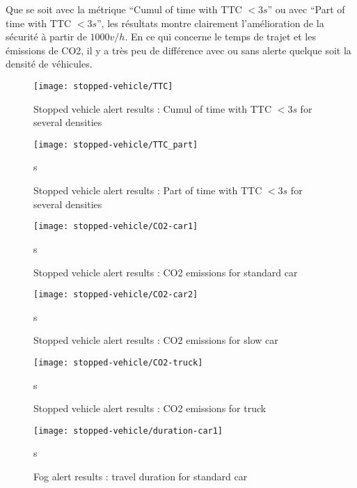 \documentclass[a4paper,10pt]{article}
\begin{document}
Que se soit avec la métrique ``Cumul of time with TTC $< 3 s$'' ou avec ``Part of time with TTC $< 3 s$'', les résultats montre clairement l'amélioration de la sécurité à partir de $1000 v/h$. En ce qui concerne le temps de trajet et les émissions de CO2, il y a très peu de différence avec ou sans alerte quelque soit la densité de véhicules.

\begin{figure}[h!]
    \begin{center}
         \texttt{[image: stopped-vehicle/TTC]}
    \end{center}
  \caption{ Stopped vehicle alert results : Cumul of time with TTC $< 3 s$ for several densities }
  \label{fig:ttc_part}
\end{figure}

\begin{figure}[h!]
    \begin{center}
         \texttt{[image: stopped-vehicle/TTC\_part]}
    \end{center}s
  \caption{ Stopped vehicle alert results : Part of time with TTC $< 3 s$ for several densities}
  \label{fig:ttc_part}
\end{figure}


\begin{figure}[h!]
    \begin{center}
         \texttt{[image: stopped-vehicle/CO2-car1]}
    \end{center}s
  \caption{ Stopped vehicle alert results : CO2 emissions for standard car}
  \label{fig:ttc_part}
\end{figure}


\begin{figure}[h!]
    \begin{center}
         \texttt{[image: stopped-vehicle/CO2-car2]}
    \end{center}s
  \caption{ Stopped vehicle alert results : CO2 emissions for slow car}
  \label{fig:ttc_part}
\end{figure}


\begin{figure}[h!]
    \begin{center}
         \texttt{[image: stopped-vehicle/CO2-truck]}
    \end{center}s
  \caption{ Stopped vehicle alert results : CO2 emissions for truck}
  \label{fig:ttc_part}
\end{figure}

\begin{figure}[h!]
    \begin{center}
         \texttt{[image: stopped-vehicle/duration-car1]}
    \end{center}s
  \caption{ Fog alert results : travel duration for standard car}
  \label{fig:ttc_part}
\end{figure}
\end{document}
